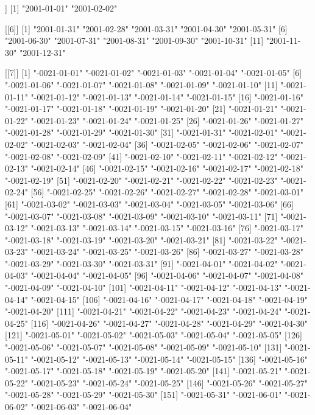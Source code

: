 \documentclass[
]{jss}
\begin{document}
\begin{CodeChunk}
\begin{CodeOutput}
[[5]]
[1] "2001-01-01" "2001-02-02"

[[6]]
 [1] "2001-01-31" "2001-02-28" "2001-03-31" "2001-04-30" "2001-05-31"
 [6] "2001-06-30" "2001-07-31" "2001-08-31" "2001-09-30" "2001-10-31"
[11] "2001-11-30" "2001-12-31"

[[7]]
  [1] "-0021-01-01" "-0021-01-02" "-0021-01-03" "-0021-01-04" "-0021-01-05"
  [6] "-0021-01-06" "-0021-01-07" "-0021-01-08" "-0021-01-09" "-0021-01-10"
 [11] "-0021-01-11" "-0021-01-12" "-0021-01-13" "-0021-01-14" "-0021-01-15"
 [16] "-0021-01-16" "-0021-01-17" "-0021-01-18" "-0021-01-19" "-0021-01-20"
 [21] "-0021-01-21" "-0021-01-22" "-0021-01-23" "-0021-01-24" "-0021-01-25"
 [26] "-0021-01-26" "-0021-01-27" "-0021-01-28" "-0021-01-29" "-0021-01-30"
 [31] "-0021-01-31" "-0021-02-01" "-0021-02-02" "-0021-02-03" "-0021-02-04"
 [36] "-0021-02-05" "-0021-02-06" "-0021-02-07" "-0021-02-08" "-0021-02-09"
 [41] "-0021-02-10" "-0021-02-11" "-0021-02-12" "-0021-02-13" "-0021-02-14"
 [46] "-0021-02-15" "-0021-02-16" "-0021-02-17" "-0021-02-18" "-0021-02-19"
 [51] "-0021-02-20" "-0021-02-21" "-0021-02-22" "-0021-02-23" "-0021-02-24"
 [56] "-0021-02-25" "-0021-02-26" "-0021-02-27" "-0021-02-28" "-0021-03-01"
 [61] "-0021-03-02" "-0021-03-03" "-0021-03-04" "-0021-03-05" "-0021-03-06"
 [66] "-0021-03-07" "-0021-03-08" "-0021-03-09" "-0021-03-10" "-0021-03-11"
 [71] "-0021-03-12" "-0021-03-13" "-0021-03-14" "-0021-03-15" "-0021-03-16"
 [76] "-0021-03-17" "-0021-03-18" "-0021-03-19" "-0021-03-20" "-0021-03-21"
 [81] "-0021-03-22" "-0021-03-23" "-0021-03-24" "-0021-03-25" "-0021-03-26"
 [86] "-0021-03-27" "-0021-03-28" "-0021-03-29" "-0021-03-30" "-0021-03-31"
 [91] "-0021-04-01" "-0021-04-02" "-0021-04-03" "-0021-04-04" "-0021-04-05"
 [96] "-0021-04-06" "-0021-04-07" "-0021-04-08" "-0021-04-09" "-0021-04-10"
[101] "-0021-04-11" "-0021-04-12" "-0021-04-13" "-0021-04-14" "-0021-04-15"
[106] "-0021-04-16" "-0021-04-17" "-0021-04-18" "-0021-04-19" "-0021-04-20"
[111] "-0021-04-21" "-0021-04-22" "-0021-04-23" "-0021-04-24" "-0021-04-25"
[116] "-0021-04-26" "-0021-04-27" "-0021-04-28" "-0021-04-29" "-0021-04-30"
[121] "-0021-05-01" "-0021-05-02" "-0021-05-03" "-0021-05-04" "-0021-05-05"
[126] "-0021-05-06" "-0021-05-07" "-0021-05-08" "-0021-05-09" "-0021-05-10"
[131] "-0021-05-11" "-0021-05-12" "-0021-05-13" "-0021-05-14" "-0021-05-15"
[136] "-0021-05-16" "-0021-05-17" "-0021-05-18" "-0021-05-19" "-0021-05-20"
[141] "-0021-05-21" "-0021-05-22" "-0021-05-23" "-0021-05-24" "-0021-05-25"
[146] "-0021-05-26" "-0021-05-27" "-0021-05-28" "-0021-05-29" "-0021-05-30"
[151] "-0021-05-31" "-0021-06-01" "-0021-06-02" "-0021-06-03" "-0021-06-04"

\end{CodeOutput}
\end{CodeChunk}
\end{document}
